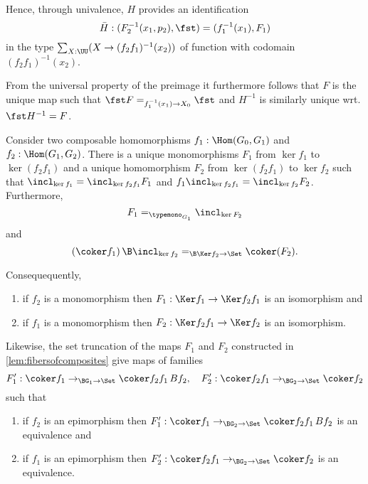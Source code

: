 Hence, through univalence, $H$ provides an identification
  $$\bar H:(F_2^{-1}(x_1,p_2),\fst)=(f_1^{-1}(x_1),F_1)$$ in the type $\sum_{X:\UU}(X\to(f_2f_1)^{-1}(x_2))$ of function with codomain $(f_2f_1)^{-1}(x_2)$.
  
From the universal property of the preimage it furthermore follows that $F$ is the unique map such that $\fst F=_{f_1^{-1}(x_1)\to X_0}\fst$ and $H^{-1}$ is similarly unique wrt. $\fst H^{-1}=F$.

\begin{corollary}
  \label{cor:cokermaps}
  Consider two composable homomorphisms $f_1:\Hom(G_0,G_1)$ and $f_2:\Hom(G_1,G_2)$.
  There is a unique monomorphisms $F_1$ from $\ker f_1$ to $\ker(f_2f_1)$ and a unique homomorphism $F_2$ from $\ker(f_2f_1)$ to $\ker f_2$ such that $\incl_{\ker f_1}=\incl_{\ker f_2f_1}F_1$ and $f_1\incl_{\ker f_2f_1}=\incl_{\ker f_2}F_2$.
  Furthermore, $$F_1=_{\typemono_{G_1}}\incl_{\ker F_2}$$ and $$(\coker f_1)\,\B\incl_{\ker f_2}=_{\B\Ker f_2\to\Set}\coker (F_2).$$

  Consequequently,
  \begin{enumerate}
  \item if $f_2$ is a monomorphism then $F_1:\Ker f_1\to\Ker f_2f_1$ is an isomorphism and
  \item if $f_1$ is a monomorphism then $F_2:\Ker f_2f_1\to\Ker f_2$ is an isomorphism.
  \end{enumerate}
Likewise, the set truncation of the maps $F_1$ and $F_2$ constructed in \cref{lem:fibersofcomposites} give maps  of families
$$F_1':\coker f_1\to_{\BG_1\to\Set}\coker f_2f_1\,Bf_2,\quad F_2':\coker f_2f_1\to_{\BG_2\to\Set}\coker f_2$$
  such that
  \begin{enumerate}
  \item if $f_2$ is an epimorphism then $F_1':\coker f_1\to_{\BG_2\to\Set}\coker f_2f_1\,Bf_2$ is an equivalence and
  \item if $f_1$ is an epimorphism then $F_2':\coker f_2f_1\to_{\BG_2\to\Set}\coker f_2$  is an equivalence.
  \end{enumerate}
\end{corollary}
